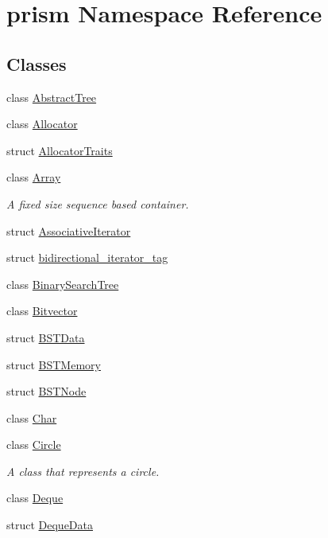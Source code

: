 \hypertarget{namespaceprism}{}\section{prism Namespace Reference}
\label{namespaceprism}
\subsection*{Classes}
\begin{DoxyCompactItemize}
\item 
class \hyperlink{classprism_1_1_abstract_tree}{Abstract\+Tree}
\item 
class \hyperlink{classprism_1_1_allocator}{Allocator}
\item 
struct \hyperlink{structprism_1_1_allocator_traits}{Allocator\+Traits}
\item 
class \hyperlink{classprism_1_1_array}{Array}
\begin{DoxyCompactList}\small\item\em A fixed size sequence based container. \end{DoxyCompactList}\item 
struct \hyperlink{structprism_1_1_associative_iterator}{Associative\+Iterator}
\item 
struct \hyperlink{structprism_1_1bidirectional__iterator__tag}{bidirectional\+\_\+iterator\+\_\+tag}
\item 
class \hyperlink{classprism_1_1_binary_search_tree}{Binary\+Search\+Tree}
\item 
class \hyperlink{classprism_1_1_bitvector}{Bitvector}
\item 
struct \hyperlink{structprism_1_1_b_s_t_data}{B\+S\+T\+Data}
\item 
struct \hyperlink{structprism_1_1_b_s_t_memory}{B\+S\+T\+Memory}
\item 
struct \hyperlink{structprism_1_1_b_s_t_node}{B\+S\+T\+Node}
\item 
class \hyperlink{classprism_1_1_char}{Char}
\item 
class \hyperlink{classprism_1_1_circle}{Circle}
\begin{DoxyCompactList}\small\item\em A class that represents a circle. \end{DoxyCompactList}\item 
class \hyperlink{classprism_1_1_deque}{Deque}
\item 
struct \hyperlink{structprism_1_1_deque_data}{Deque\+Data}
\item 

\end{DoxyCompactItemize}
